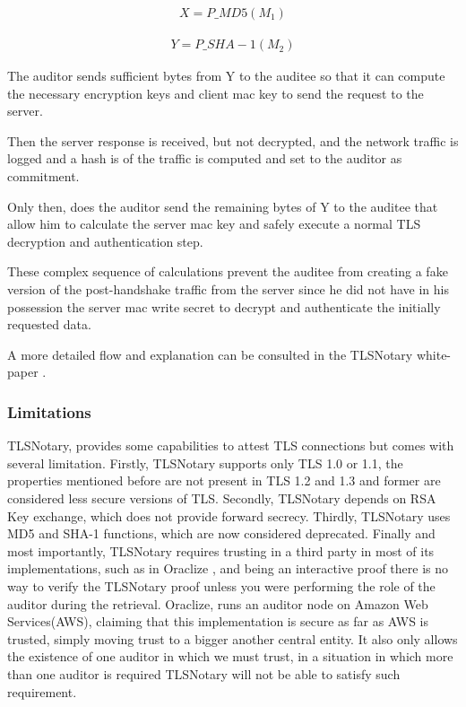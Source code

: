 \begin{ceqn}
    \begin{align}
        X = P\_MD5(M_{1})
    \end{align}
\end{ceqn}

\begin{ceqn}
    \begin{align}
        Y = P\_SHA-1(M_{2})
    \end{align}
\end{ceqn}

The auditor sends sufficient bytes from Y to the auditee so that it can compute the necessary encryption keys and client mac key to send the request to the server. 

Then the server response is received, but not decrypted, and the network traffic is logged and a hash is of the traffic is computed and set to the auditor as commitment. 

Only then, does the auditor send the remaining bytes of Y to the auditee that allow him to calculate the server mac key and safely execute a normal TLS decryption and authentication step.

These complex sequence of calculations prevent the auditee from creating a fake version of the post-handshake traffic from the server since he did not have in his possession the server mac write secret to decrypt and authenticate the initially requested data.

A more detailed flow and explanation can be consulted in the TLSNotary white-paper \cite{2014TLSnotary-aSessions}.

   
\subsubsection{Limitations}
TLSNotary, provides some capabilities to attest TLS connections but comes with several limitation. Firstly, TLSNotary supports only TLS 1.0 or 1.1, the properties mentioned before are not present in TLS 1.2 and 1.3 and former are considered less secure versions of TLS. Secondly, TLSNotary depends on RSA Key exchange, which does not provide forward secrecy. Thirdly, TLSNotary uses MD5 and SHA-1 functions, which are now considered deprecated. Finally and most importantly, TLSNotary requires trusting in a third party in most of its implementations, such as in Oraclize \cite{Oraclize.it2018OraclizeDocumentation}, and being an interactive proof there is no way to verify the TLSNotary proof unless you were performing the role of the auditor during the retrieval. Oraclize, runs an auditor node on Amazon Web Services(AWS), claiming that this implementation is secure as far as AWS is trusted, simply moving trust to a bigger another central entity. It also only allows the existence of one auditor in which we must trust, in a situation in which more than one auditor is required TLSNotary will not be able to satisfy such requirement.


